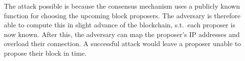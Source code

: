 The attack possible is because the consensus mechanism uses a publicly known function for choosing the upcoming block proposers.
The adversary is therefore able to compute this in slight advance of the blockchain, s.t.\ each proposer is now known.
After this, the adversary can map the proposer's IP addresses and overload their connection.
A successful attack would leave a proposer unable to propose their block in time.